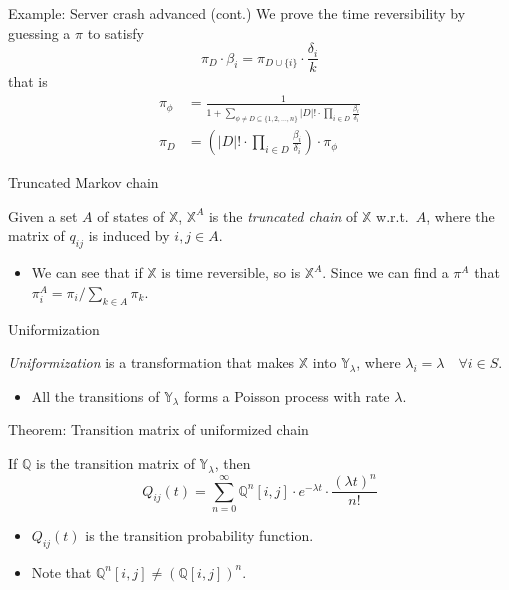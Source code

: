 \documentclass[mathserif]{beamer}
\begin{document}
\begin{frame}{Example: Server crash advanced (cont.)}
We prove the time reversibility by guessing a $\pi$ to satisfy
\[
\pi_D\cdot \beta_i = \pi_{D\cup\{i\}}\cdot \frac{\delta_i}{k}
\]
that is
\begin{align*}
\pi_\phi & = \frac{1}{1 + \sum_{\phi\neq D\subseteq \{1,2,\ldots,n\}} |D|!\cdot \prod_{i\in D}\frac{\beta_i}{\delta_i}} \\
\pi_D & = (|D|!\cdot \prod_{i\in D}\frac{\beta_i}{\delta_i})\cdot \pi_\phi
\end{align*}
\end{frame}

\begin{frame}{Truncated Markov chain}
\begin{definition}
Given a set $A$ of states of $\mathbb{X}$, $\mathbb{X}^A$ is the \emph{truncated chain} of $\mathbb{X}$ w.r.t.\ $A$,
where the matrix of $q_{ij}$ is induced by $i,j\in A$.
\end{definition}
\begin{itemize}
\item We can see that if $\mathbb{X}$ is time reversible, so is $\mathbb{X}^A$.
Since we can find a $\pi^A$ that $\pi_i^A = \pi_i / \sum_{k\in A}\pi_k$.
\end{itemize}
\end{frame}

\begin{frame}{Uniformization}
\begin{definition}
\emph{Uniformization} is a transformation that makes $\mathbb{X}$ into $\mathbb{Y}_\lambda$, where $\lambda_i = \lambda\quad\forall i\in S$.
\end{definition}
\begin{itemize}
\item All the transitions of $\mathbb{Y}_\lambda$ forms a Poisson process with rate $\lambda$.
\end{itemize}
\end{frame}

\begin{frame}{Theorem: Transition matrix of uniformized chain}
\begin{theorem}
If $\mathbb{Q}$ is the transition matrix of $\mathbb{Y}_\lambda$, then
\[
Q_{ij}(t) = \sum_{n=0}^\infty \mathbb{Q}^n[i,j]\cdot e^{-\lambda t}\cdot \frac{(\lambda t)^n}{n!}
\]
\end{theorem}
\begin{itemize}
\item $Q_{ij}(t)$ is the transition probability function.
\item Note that $\mathbb{Q}^n[i,j]\neq (\mathbb{Q}[i,j])^n$.
\end{itemize}
\end{frame}
\end{document}
